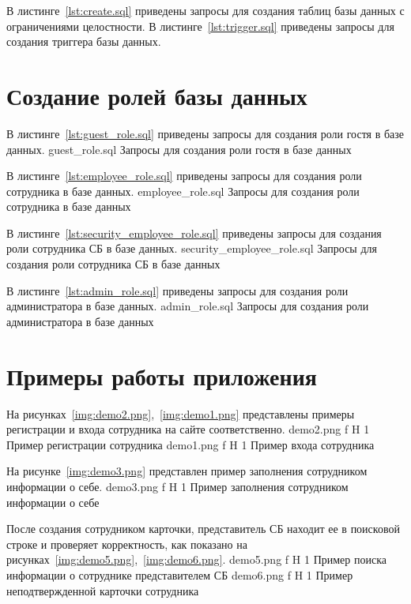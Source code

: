 В листинге~\ref{lst:create.sql} приведены запросы для создания таблиц базы данных с ограничениями целостности.
В листинге~\ref{lst:trigger.sql} приведены запросы для создания триггера базы данных.

\section{Создание ролей базы данных}

В листинге~\ref{lst:guest_role.sql} приведены запросы для создания роли гостя в базе данных.
	{guest_role.sql}
	{Запросы для создания роли гостя в базе данных}

В листинге~\ref{lst:employee_role.sql} приведены запросы для создания роли сотрудника в базе данных.
	{employee_role.sql}
	{Запросы для создания роли сотрудника в базе данных}
	
\clearpage
	
В листинге~\ref{lst:security_employee_role.sql} приведены запросы для создания роли сотрудника СБ в базе данных.
	{security_employee_role.sql}
	{Запросы для создания роли сотрудника СБ в базе данных}
	
В листинге~\ref{lst:admin_role.sql} приведены запросы для создания роли администратора в базе данных.
	{admin_role.sql}
	{Запросы для создания роли администратора в базе данных}
	
\clearpage

\section{Примеры работы приложения}

На рисунках~\ref{img:demo2.png},~\ref{img:demo1.png} представлены примеры регистрации и входа сотрудника на сайте соответственно.
	{demo2.png}
	{f}
	{H}
	{1\textwidth}
	{Пример регистрации сотрудника}
	{demo1.png}
	{f}
	{H}
	{1\textwidth}
	{Пример входа сотрудника}
	
\clearpage

На рисунке~\ref{img:demo3.png} представлен пример заполнения сотрудником информации о себе.
	{demo3.png}
	{f}
	{H}
	{1\textwidth}
	{Пример заполнения сотрудником информации о себе}
	
После создания сотрудником карточки, представитель СБ находит ее в поисковой строке и проверяет корректность, как показано на рисунках~\ref{img:demo5.png},~\ref{img:demo6.png}.
	{demo5.png}
	{f}
	{H}
	{1\textwidth}
	{Пример поиска информации о сотруднике представителем СБ}
	{demo6.png}
	{f}
	{H}
	{1\textwidth}
	{Пример неподтвержденной карточки сотрудника}


